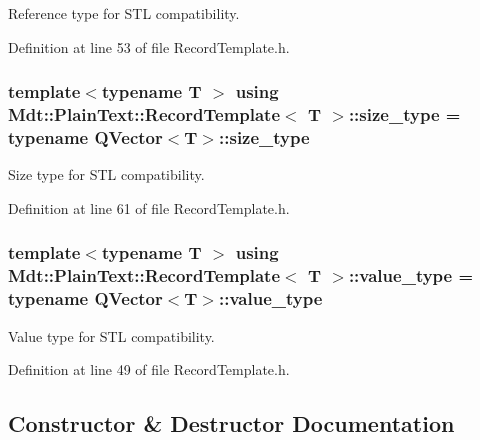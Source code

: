Reference type for S\+TL compatibility. 



Definition at line 53 of file Record\+Template.\+h.

\subsubsection[{\texorpdfstring{size\+\_\+type}{size_type}}]{\setlength{\rightskip}{0pt plus 5cm}template$<$typename T $>$ using {\bf Mdt\+::\+Plain\+Text\+::\+Record\+Template}$<$ T $>$\+::{\bf size\+\_\+type} =  typename Q\+Vector$<$T$>$\+::{\bf size\+\_\+type}}\hypertarget{class_mdt_1_1_plain_text_1_1_record_template_ad2fed94c3d0dc5b0c3e28db212441a27}{}\label{class_mdt_1_1_plain_text_1_1_record_template_ad2fed94c3d0dc5b0c3e28db212441a27}


Size type for S\+TL compatibility. 



Definition at line 61 of file Record\+Template.\+h.

\subsubsection[{\texorpdfstring{value\+\_\+type}{value_type}}]{\setlength{\rightskip}{0pt plus 5cm}template$<$typename T $>$ using {\bf Mdt\+::\+Plain\+Text\+::\+Record\+Template}$<$ T $>$\+::{\bf value\+\_\+type} =  typename Q\+Vector$<$T$>$\+::{\bf value\+\_\+type}}\hypertarget{class_mdt_1_1_plain_text_1_1_record_template_aafbe895c9784b0900130930c5388754a}{}\label{class_mdt_1_1_plain_text_1_1_record_template_aafbe895c9784b0900130930c5388754a}


Value type for S\+TL compatibility. 



Definition at line 49 of file Record\+Template.\+h.



\subsection{Constructor \& Destructor Documentation}
